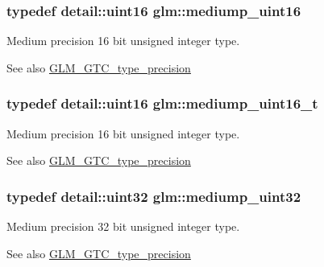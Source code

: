 \subsubsection[{\texorpdfstring{mediump\+\_\+uint16}{mediump_uint16}}]{\setlength{\rightskip}{0pt plus 5cm}typedef detail\+::uint16 {\bf glm\+::mediump\+\_\+uint16}}\hypertarget{group__gtc__type__precision_ga2cef3a0d7b0fce75c9885f64656d8933}{}\label{group__gtc__type__precision_ga2cef3a0d7b0fce75c9885f64656d8933}
Medium precision 16 bit unsigned integer type. \begin{DoxySeeAlso}{See also}
\hyperlink{group__gtc__type__precision}{G\+L\+M\+\_\+\+G\+T\+C\+\_\+type\+\_\+precision} 
\end{DoxySeeAlso}
\subsubsection[{\texorpdfstring{mediump\+\_\+uint16\+\_\+t}{mediump_uint16_t}}]{\setlength{\rightskip}{0pt plus 5cm}typedef detail\+::uint16 {\bf glm\+::mediump\+\_\+uint16\+\_\+t}}\hypertarget{group__gtc__type__precision_ga0b385466deac5ac96061ef2cdd6db20f}{}\label{group__gtc__type__precision_ga0b385466deac5ac96061ef2cdd6db20f}
Medium precision 16 bit unsigned integer type. \begin{DoxySeeAlso}{See also}
\hyperlink{group__gtc__type__precision}{G\+L\+M\+\_\+\+G\+T\+C\+\_\+type\+\_\+precision} 
\end{DoxySeeAlso}
\subsubsection[{\texorpdfstring{mediump\+\_\+uint32}{mediump_uint32}}]{\setlength{\rightskip}{0pt plus 5cm}typedef detail\+::uint32 {\bf glm\+::mediump\+\_\+uint32}}\hypertarget{group__gtc__type__precision_ga861dbd1051f488e425b3966001b568e5}{}\label{group__gtc__type__precision_ga861dbd1051f488e425b3966001b568e5}
Medium precision 32 bit unsigned integer type. \begin{DoxySeeAlso}{See also}
\hyperlink{group__gtc__type__precision}{G\+L\+M\+\_\+\+G\+T\+C\+\_\+type\+\_\+precision} 
\end{DoxySeeAlso}
